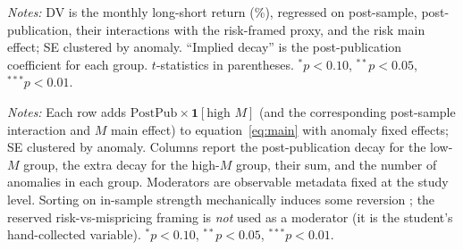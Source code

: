 \documentclass[12pt]{article}
\begin{document}
\begin{table}[htbp]\centering
\begin{threeparttable}
\caption{Framing heterogeneity: no reliable risk-vs-mispricing difference}\label{tab:hetero}\small

\begin{tablenotes}\small\item \textit{Notes:} DV is the monthly long-short return (\%),
regressed on post-sample, post-publication, their interactions with the risk-framed proxy, and
the risk main effect; SE clustered by anomaly. ``Implied decay'' is the post-publication
coefficient for each group. $t$-statistics in parentheses.
$^{*}p<0.10$, $^{**}p<0.05$, $^{***}p<0.01$.
\end{tablenotes}
\end{threeparttable}
\end{table}

\begin{table}[htbp]\centering
\begin{threeparttable}
\caption{Heterogeneity of the decay by observable anomaly strength (H4)}\label{tab:hetero-ext}\small

\begin{tablenotes}\small\item \textit{Notes:} Each row adds
$\text{PostPub}\times\mathbf{1}[\text{high }M]$ (and the corresponding post-sample interaction
and $M$ main effect) to equation~\eqref{eq:main} with anomaly fixed effects; SE clustered by
anomaly. Columns report the post-publication decay for the low-$M$ group, the extra decay for
the high-$M$ group, their sum, and the number of anomalies in each group. Moderators are
observable metadata fixed at the study level. Sorting on in-sample strength mechanically induces
some reversion \citep{harveyliuzhu2016}; the reserved risk-vs-mispricing framing is
\emph{not} used as a moderator (it is the student's hand-collected variable).
$^{*}p<0.10$, $^{**}p<0.05$, $^{***}p<0.01$.
\end{tablenotes}
\end{threeparttable}
\end{table}
\end{document}
